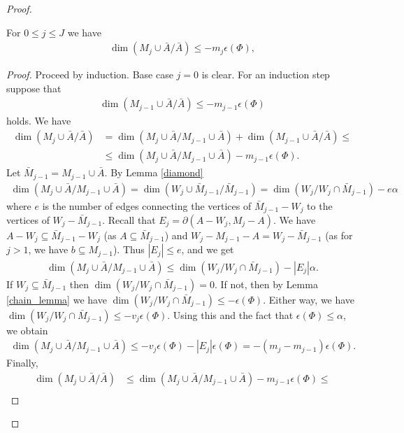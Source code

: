 \documentclass{amsart}
\newcommand{\BA}{\bar A}
\newcommand{\BM}{\bar M_{j-1}}
\begin{document}
\begin{proof}
  \begin{Lemma} \label{ubdim_lemma}
    For $0 \leq j \leq J$ we have
    \begin{align*}
      \dim(M_j \cup \BA / \BA) \leq -m_j  \epsilon(\Phi),
    \end{align*}
  \end{Lemma}
  \begin{proof}
    Proceed by induction. Base case $j = 0$ is clear.    
    For an induction step suppose that
    \begin{align*}
      \dim(M_{j-1} \cup \BA / \BA) \leq  - m_{j-1}  \epsilon(\Phi)
    \end{align*}
    holds.
    We have
    \begin{align*}
      \dim(M_j \cup \BA / \BA) &= \dim(M_j \cup \BA / M_{j-1} \cup \BA) + \dim(M_{j-1} \cup \BA / \BA) \leq \\
      &\leq \dim(M_j \cup \BA / M_{j-1} \cup \BA) - m_{j-1}  \epsilon(\Phi).
    \end{align*}
    Let $\BM = M_{j-1} \cup \BA$.
    By Lemma \ref{diamond}
    \begin{align*}
      \dim(M_j \cup \BA / M_{j-1} \cup \BA) = \dim(W_j \cup \BM / \BM) = \dim(W_j / W_j \cap \BM) - e \alpha
    \end{align*}
    where $e$ is the number of edges connecting the vertices of $\BM - W_j$ to the vertices of $W_j - \BM$.
    Recall that       $E_j = \partial(A - W_j, M_j - A)$.
    We have $A - W_j \subseteq \BM - W_j$ (as $A \subseteq \BM$) and $W_j - M_{j-1} - A = W_j - \BM$ (as for $j > 1$, we have $b \subseteq M_{j-1}$).
    Thus $|E_j| \leq e$, and we get 
    \begin{align*}
      \dim(M_j \cup \BA / M_{j-1} \cup \BA) \leq \dim(W_j / W_j \cap \BM) - |E_j| \alpha.
    \end{align*}
    If $W_j \subseteq \BM$ then $\dim(W_j / W_j \cap \BM) = 0$.
    If not, then by Lemma \ref{chain_lemma} we have $\dim(W_j / W_j \cap \BM) \leq - \epsilon(\Phi)$.
    Either way, we have $\dim(W_j / W_j \cap \BM) \leq - v_j \epsilon(\Phi)$.
    Using this and the fact that $\epsilon(\Phi) \leq \alpha$, we obtain
    \begin{align*}
      \dim(M_j \cup \BA / M_{j-1} \cup \BA) \leq - v_j \epsilon(\Phi) - |E_j| \epsilon(\Phi) = -(m_j - m_{j-1})\epsilon(\Phi).
    \end{align*}
    Finally,
    \begin{align*}
      \dim(M_j \cup \BA / \BA) &\leq \dim(M_j \cup \BA / M_{j-1} \cup \BA) - m_{j-1}  \epsilon(\Phi) \leq \\

\end{align*}
\end{proof}
\end{proof}
\end{document}
